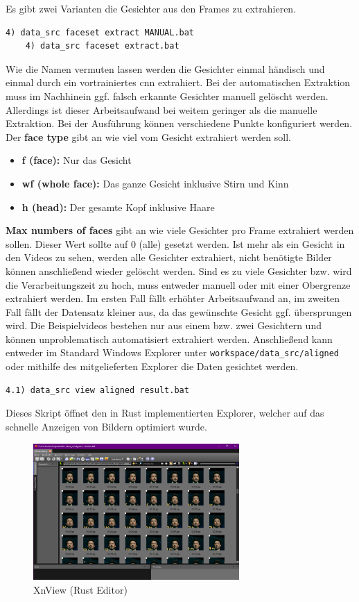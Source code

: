 Es gibt zwei Varianten die Gesichter aus den Frames zu extrahieren.
\begin{lstlisting}[numbers=none,label={lst:extraction-2}]
    4) data_src faceset extract MANUAL.bat
    4) data_src faceset extract.bat
\end{lstlisting}
Wie die Namen vermuten lassen werden die Gesichter einmal händisch und einmal durch ein vortrainiertes \gls{cnn} extrahiert.
Bei der automatischen Extraktion muss im Nachhinein ggf. falsch erkannte Gesichter manuell gelöscht werden.
Allerdings ist dieser Arbeitsaufwand bei weitem geringer als die manuelle Extraktion.
Bei der Ausführung können verschiedene Punkte konfiguriert werden.
Der \textbf{face type} gibt an wie viel vom Gesicht extrahiert werden soll.
\begin{itemize}
    \item \textbf{f (face):} Nur das Gesicht
    \item \textbf{wf (whole face):} Das ganze Gesicht inklusive Stirn und Kinn
    \item \textbf{h (head):} Der gesamte Kopf inklusive Haare
\end{itemize}
\textbf{Max numbers of faces} gibt an wie viele Gesichter pro Frame extrahiert werden sollen.
Dieser Wert sollte auf $0$ (alle) gesetzt werden.
Ist mehr als ein Gesicht in den Videos zu sehen, werden alle Gesichter extrahiert, nicht benötigte Bilder können anschließend wieder gelöscht werden.
Sind es zu viele Gesichter bzw. wird die Verarbeitungszeit zu hoch, muss entweder manuell oder mit einer Obergrenze extrahiert werden.
Im ersten Fall fällt erhöhter Arbeitsaufwand an, im zweiten Fall fällt der Datensatz kleiner aus, da das gewünschte Gesicht ggf. übersprungen wird.
Die Beispielvideos bestehen nur aus einem bzw. zwei Gesichtern und können unproblematisch automatisiert extrahiert werden.
Anschließend kann entweder im Standard Windows Explorer unter \texttt{workspace/data\_src/aligned} oder mithilfe des mitgelieferten Explorer die Daten gesichtet werden.
\begin{lstlisting}[label={lst:extraction-3},numbers=none]
    4.1) data_src view aligned result.bat
\end{lstlisting}
Dieses Skript öffnet den in Rust implementierten Explorer, welcher auf das schnelle Anzeigen von Bildern optimiert wurde.
\begin{figure}
    \center
    \includegraphics[width=0.7\textwidth]{Bilder/DFL/XnView}
    \caption{XnView (Rust Editor)}
    \label{fig:xnview}
\end{figure}
